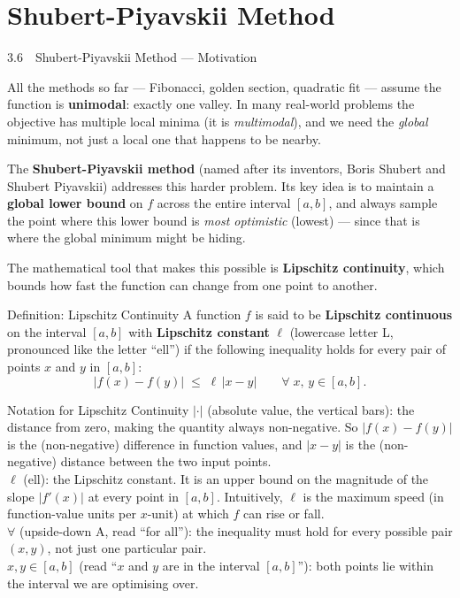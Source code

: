 \documentclass[aspectratio=169,10pt]{beamer}
\begin{document}
\section{Shubert-Piyavskii Method}

\begin{frame}[allowframebreaks]{3.6\ \ Shubert-Piyavskii Method --- Motivation}

  All the methods so far --- Fibonacci, golden section, quadratic fit ---
  assume the function is \textbf{unimodal}: exactly one valley.  In many
  real-world problems the objective has multiple local minima (it is
  \emph{multimodal}), and we need the \emph{global} minimum, not just a
  local one that happens to be nearby.

  The \textbf{Shubert-Piyavskii method} (named after its inventors, Boris
  Shubert and Shubert Piyavskii) addresses this harder problem.  Its key idea
  is to maintain a \textbf{global lower bound} on $f$ across the entire
  interval $[a, b]$, and always sample the point where this lower bound is
  \emph{most optimistic} (lowest) --- since that is where the global minimum
  might be hiding.

  The mathematical tool that makes this possible is
  \textbf{Lipschitz continuity}, which bounds how fast the function can
  change from one point to another.

  \begin{block}{Definition: Lipschitz Continuity}
    A function $f$ is said to be \textbf{Lipschitz continuous} on the interval
    $[a, b]$ with \textbf{Lipschitz constant} $\ell$ (lowercase letter L,
    pronounced like the letter ``ell'') if the following inequality holds for
    every pair of points $x$ and $y$ in $[a, b]$:
    \[
      |f(x) - f(y)| \;\le\; \ell \,|x - y|
      \qquad \forall\; x,\, y \in [a, b].
    \]
  \end{block}

  \begin{block}{Notation for Lipschitz Continuity}
    $|\cdot|$ (absolute value, the vertical bars): the distance from zero,
    making the quantity always non-negative.  So $|f(x) - f(y)|$ is the
    (non-negative) difference in function values, and $|x - y|$ is the
    (non-negative) distance between the two input points.\\
    $\ell$ (ell): the Lipschitz constant.  It is an upper bound on the
    magnitude of the slope $|f'(x)|$ at every point in $[a, b]$.
    Intuitively, $\ell$ is the maximum speed (in function-value units per
    $x$-unit) at which $f$ can rise or fall.\\
    $\forall$ (upside-down A, read ``for all''): the inequality must hold
    for every possible pair $(x, y)$, not just one particular pair.\\
    $x, y \in [a, b]$ (read ``$x$ and $y$ are in the interval $[a, b]$''):
    both points lie within the interval we are optimising over.
  \end{block}


\end{frame}
\end{document}
